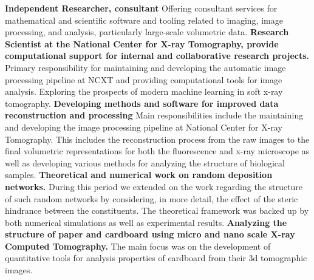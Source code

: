 {}{}{\textbf{Independent Researcher, consultant }
    Offering consultant services for mathematical and scientific software and tooling related to imaging, image processing, and analysis, particularly large-scale volumetric data.}
{}{}{\textbf{Research Scientist at the National Center for X-ray Tomography, provide computational support for internal and collaborative research projects.}
    Primary responsibility for maintaining and developing the automatic image processing pipeline at NCXT and providing computational tools for image analysis. Exploring the prospects of modern machine learning in soft x-ray tomography.}
{}{}{\textbf{Developing methods and software for improved data reconstruction and processing}
    Main responsibilities include the maintaining and developing the image processing pipeline at National Center for X-ray Tomography. This includes the reconstruction process from the raw images to the final volumetric representations for both the fluorescence and x-ray microscope as well as developing various methods for analyzing the structure of biological samples.}
%
{}{}{\textbf{Theoretical and numerical work on random deposition networks. }
    During this period we extended on the work regarding the structure of such random networks by considering, in more detail, the effect of the steric hindrance between the constituents. The theoretical framework was backed up by both numerical simulations as well as experimental results.}
%
{}{}{\textbf{Analyzing the structure of paper and cardboard using micro and nano scale X-ray Computed Tomography. }
    The main focus was on the development of quantitative tools for analysis properties of cardboard from their 3d tomographic images.}
